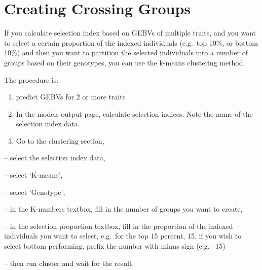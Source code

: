 \documentclass[
  12pt,
]{book}
\begin{document}
\hypertarget{creating-crossing-groups}{%
\section{Creating Crossing Groups}\label{creating-crossing-groups}}

If you calculate selection index based on GEBVs of multiple traits, and you want to select a certain proportion of the indexed individuals (e.g.~top 10\%, or bottom 10\%) and then you want to partition the selected individuals into a number of groups based on their genotypes, you can use the k-means clustering method.

The procedure is:

\begin{enumerate}
\def\labelenumi{(\arabic{enumi})}
\item
  predict GEBVs for 2 or more traits
\item
  In the models output page, calculate selection indices. Note the name of the selection index data.
\item
  Go to the clustering section,
\end{enumerate}

-- select the selection index data,

-- select `K-means',

-- select `Genotype',

-- in the K-numbers textbox, fill in the number of groups you want to create,

-- in the selection proportion textbox, fill in the proportion of the indexed individuals you want to select, e.g.~for the top 15 percent, 15. if you wish to select bottom performing, prefix the number with minus sign (e.g.~-15)

-- then run cluster and wait for the result.
\end{document}

